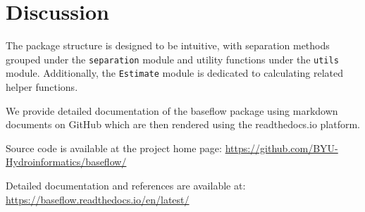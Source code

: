 \documentclass[hydrology,article,submit,pdftex,moreauthors]{Definitions/mdpi}
\begin{document}
\section{Discussion}
\label{sec:discussion}

The package structure is designed to be intuitive, with separation methods grouped under the \texttt{separation} module and utility functions under the \texttt{utils} module. Additionally, the \texttt{Estimate} module is dedicated to calculating related helper functions.

We provide detailed documentation of the baseflow package using markdown documents on GitHub which are then rendered using the readthedocs.io platform.

Source code is available at the project home page:
\url{https://github.com/BYU-Hydroinformatics/baseflow/}

Detailed documentation and references are available at:
\url{https://baseflow.readthedocs.io/en/latest/}

\vspace{6pt}






\end{document}
